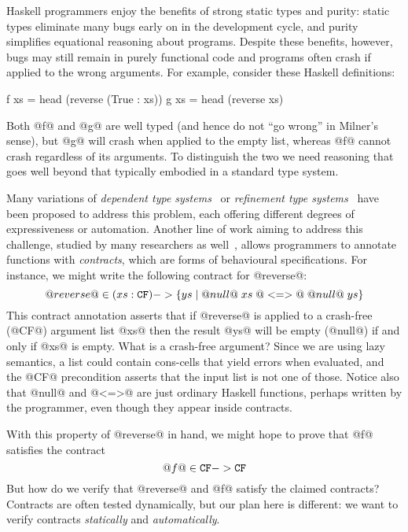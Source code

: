 Haskell programmers enjoy the benefits of strong static types and purity: 
static types eliminate many bugs early on in the development cycle, and purity 
simplifies equational reasoning about programs. Despite these benefits, however, 
bugs may still remain in purely functional code and programs often
crash if applied to the wrong arguments. 
For example, consider these Haskell definitions:
\begin{code}
  f xs = head (reverse (True : xs))
  g xs = head (reverse xs)
\end{code}
Both @f@ and @g@ are well typed (and hence do not ``go wrong'' in Milner's 
sense), but @g@ will crash when applied to the empty list, whereas @f@
cannot crash regardless of its arguments.
To distinguish the two we need reasoning that goes well beyond 
that typically embodied in a standard type system.

Many variations of {\em dependent type systems}~\cite{norell:thesis,Xi:2007:DMA:1230756.1230759,fstar} or 
{\em refinement type systems}~\cite{Rondon:2008:LT:1375581.1375602,Knowles+:sage}
have been proposed to address this problem, each offering different degrees of 
expressiveness or automation. 
Another line of work aiming to address this challenge, studied by many researchers
as well~\cite{Findler:2002:CHF:581478.581484,Blume:2006:SCM:1166013.1166016,Knowles+:sage,Siek06gradualtyping,Wadler:2009:WPC:1532974.1532976}, allows programmers to annotate 
functions with {\em contracts}, which are forms of behavioural specifications.
For instance, we might write the following contract for 
@reverse@: 
\[ @reverse@ \in (xs : {\tt CF}) -> \{ ys \mid @null@\;xs\; @<=>@\; @null@\;ys \}  \] 
This contract annotation asserts that if @reverse@ is applied to a 
crash-free (@CF@) argument list @xs@ then the result @ys@ will be empty (@null@) 
if and only if @xs@ is empty. What is a crash-free argument? 
Since we are using lazy semantics, a list could contain cons-cells that yield 
errors when evaluated, and the @CF@ precondition asserts that the input list 
is not one of those.
Notice also that @null@ and @<=>@ are just ordinary Haskell functions, perhaps
written by the programmer, even though they appear inside contracts.

With this property of @reverse@ in hand, we might 
hope to prove that @f@ satisfies the contract
\[ @f@ \in {\tt CF} -> {\tt CF} \] 
But how do we verify that @reverse@ and @f@ satisfy the claimed
contracts? Contracts are often tested dynamically, but 
our plan here is different: we want to verify contracts \emph{statically} 
and \emph{automatically}. 

